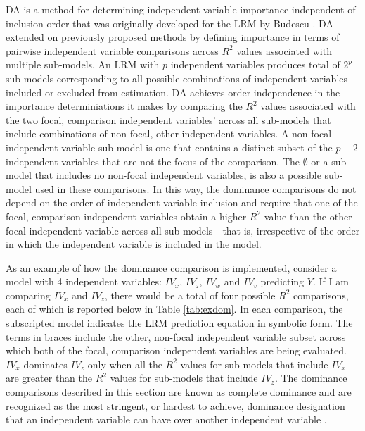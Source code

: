 \documentclass[man]{apa7}
\begin{document}
	DA is a method for determining independent variable importance independent of inclusion order that was originally developed for the LRM by Budescu \parencite*{budescu1993dominance}.
	DA extended on previously proposed methods by defining importance in terms of pairwise independent variable comparisons across $R^2$ values associated with multiple sub-models.
	An LRM with $p$ independent variables produces total of $2^p$ sub-models corresponding to all possible combinations of independent variables included or excluded from estimation.
	DA achieves order independence in the importance determiniations it makes by comparing the $R^2$ values associated with the two focal, comparison independent variables' across all sub-models that include combinations of non-focal, other independent variables. 
	A non-focal independent variable sub-model is one that contains a distinct subset of the $p - 2$ independent variables that are not the focus of the comparison.
	The $\emptyset$ or a sub-model that includes no non-focal independent variables, is also a possible sub-model used in these comparisons.	
	In this way, the dominance comparisons do not depend on the order of independent variable inclusion and require that one of the focal, comparison independent variables obtain a higher $R^2$ value than the other focal independent variable across all sub-models---that is, irrespective of the order in which the independent variable is included in the model.
	
	As an example of how the dominance comparison is implemented, consider a model with 4 independent variables: $IV_x$, $IV_z$, $IV_w$ and $IV_v$ predicting $Y$.
	If I am comparing $IV_x$ and $IV_z$, there would be a total of four possible $R^2$ comparisons, each of which is reported below in Table \ref{tab:exdom}.
	In each comparison, the subscripted model indicates the LRM prediction equation in symbolic form.
	The terms in braces include the other, non-focal independent variable subset across which both of the focal, comparison independent variables are being evaluated.
	$IV_x$ dominates $IV_z$ only when all the $R^2$ values for sub-models that include $IV_x$ are greater than the $R^2$ values for sub-models that include $IV_z$.
	The dominance comparisons described in this section are known as complete dominance and are recognized as the most stringent, or hardest to achieve, dominance designation that an independent variable can have over another independent variable \parencite{azen2003dominance}.	
\end{document}
